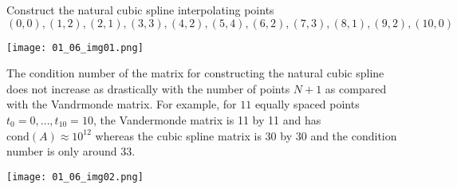 \begin{example}
Construct the natural cubic spline interpolating points
$$
(0,0),(1,2),(2,1),(3,3),(4,2),(5,4),(6,2),(7,3),(8,1),(9,2),(10,0)
$$
\begin{center}
\texttt{[image: 01\_06\_img01.png]}
\end{center}
\end{example}

\begin{note}
The condition number of the matrix for constructing the natural cubic spline does not increase as drastically with the number of points $N+1$ as compared with the Vandrmonde matrix. For example, for $11$ equally spaced points $t_0=0,\dots,t_{10}=10$, the Vandermonde matrix is 11 by 11 and has $\mathrm{cond}(A) \approx 10^{12}$ whereas the cubic spline matrix is 30 by 30 and the condition number is only around $33$.
\begin{center}
\texttt{[image: 01\_06\_img02.png]}
\end{center}
\end{note}